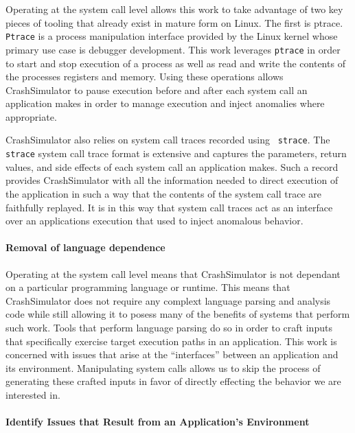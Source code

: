         Operating at the system call level allows this work to take advantage of
        two key pieces of tooling that already exist in mature form on Linux.
        The first is ptrace. {\tt Ptrace} is a process manipulation interface provided
        by the Linux kernel whose primary use case is debugger development.
        This work leverages {\tt ptrace} in order to start and stop execution of a
        process as well as read and write the contents of the processes
        registers and memory.  Using these operations allows CrashSimulator to
        pause execution before and after each system call an application makes
        in order to manage execution and inject anomalies where appropriate.

        CrashSimulator also relies on system call traces recorded using {\tt
          strace}.  The {\tt strace} system call trace format is extensive and
        captures the parameters, return values, and side effects of each system
        call an application makes.  Such a record provides CrashSimulator with
        all the information needed to direct execution of the application in
        such a way that the contents of the system call trace are faithfully
        replayed.  It is in this way that system call traces act as an interface
        over an applications execution that used to inject anomalous behavior.

        \paragraph{Removal of language dependence}

        Operating at the system call level means that CrashSimulator is not
        dependant on a particular programming language or runtime.  This means
        that CrashSimulator does not require any complext language parsing and
        analysis code while still allowing it to posess many of the benefits of
        systems that perform such work.  Tools that perform language parsing do
        so in order to craft inputs that specifically exercise target execution
        paths in an application.  This work is concerned with issues that arise
        at the ``interfaces'' between an application and its environment.
        Manipulating system calls allows us to skip the process of generating
        these crafted inputs in favor of directly effecting the behavior we are
        interested in.

        \paragraph{Identify Issues that Result from an Application's Environment}


